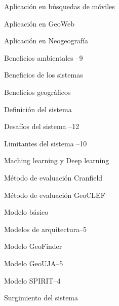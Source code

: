 \begin{theindex}
\item Aplicación en búsquedas de móviles 
\item Aplicación en GeoWeb 
\item Aplicación en Neogeografía 
\item Beneficios ambientales --9
\item Beneficios de los sistemas 
\item Beneficios geográficos 
\item Definición del sistema 
\item Desafíos del sistema --12
\item Limitantes del sistema --10
\item Maching learning y Deep learning 
\item Método de evaluación Cranfield
\item Método de evaluación GeoCLEF
\item Modelo básico
\item Modelos de arquitectura--5
\item Modelo GeoFinder
\item Modelo GeoUJA--5
\item Modelo SPIRIT--4
\item Surgimiento del sistema 
\end{theindex}

